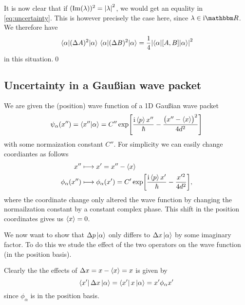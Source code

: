 \documentclass[11pt,letter, swedish, english
]{article}
\begin{document}
It is now clear that if $(\Im(\lambda))^2=\abs{\lambda}^2$, we would
get an equality in \eqref{eq:uncertainty}. This is however precisely
the case here, since $\lambda\in\ii\R$. We therefore have
\begin{equation} 
\ev{(\Delta{A})^2}{\alpha}\ev{(\Delta{B})^2}{\alpha} 
= \frac{1}{4} \abs{\ev**{\comm{A}{B}}{\alpha}}^2
\end{equation}
in this situation.\qed

\subsection{Uncertainty in a Gaußian wave packet}
We are given the (position) wave function of a 1D Gaußian wave packet
\begin{equation}
\psi_\alpha(x'') = \braket{x''}{\alpha} 
= C'' \exp[\frac{\ii\ev{p}x''}{\hbar}-\frac{\big(x''-\ev{x}\!\big)^2}{4d^2}]
\end{equation}
with some normaization constant $C''$. For simplicity we can easily
change coordiantes as follows
\begin{equation}
\begin{aligned}
x'' \longmapsto&\; x'=x''-\ev{x}\\
\phi_\alpha(x'') \longmapsto&\; \phi_\alpha(x') 
= C' \exp[\frac{\ii\ev{p}x'}{\hbar}-\frac{x'^2}{4d^2}],
\end{aligned}
\end{equation}
where the coordinate change only altered the wave function by
changing the normailzation constant by a constant complex phase. This
shift in the position coordinates gives us $\ev{x}=0$.

We now want to show that $\Delta{p}\ket{\alpha}$ only differs to
$\Delta{x}\ket{\alpha}$ by some imaginary factor. To do this we stude
the effect of the two operators on the wave function (in the position
basis). 

Clearly the the effects of $\Delta{x}=x-\ev{x}=x$ is given by
\begin{equation}
\bra{x'}\Delta{x}\ket{\alpha} = \bra{x'}x\ket{\alpha} = x'\phi_\alpha{x'}
\end{equation}
since $\phi_\alpha$ is in the position basis. 
\end{document}
